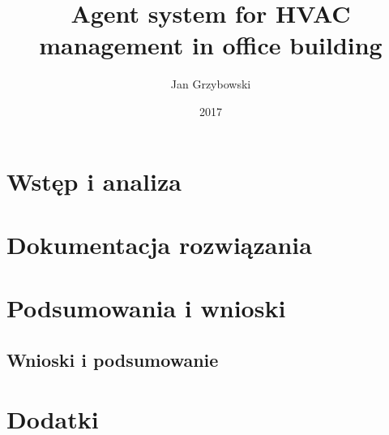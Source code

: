 \documentclass[pl]{minipw} %
\title{Agent system for HVAC management in office building} %
\author{Jan Grzybowski}
\date{2017}
\begin{document}
\sloppy
  
\setcounter{page}{1}

% 


\tableofcontents

\cleardoublepage
\pagestyle{fancy}

\part{Wstęp i analiza}




\part{Dokumentacja rozwiązania}








\part{Podsumowania i wnioski}
\chapter{Wnioski i podsumowanie}






\part{Dodatki}
\begin{appendices}
   
   
\end{appendices}


\end{document}
